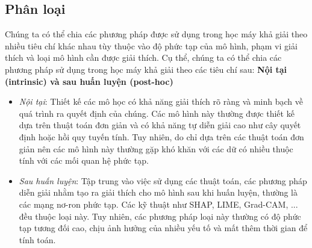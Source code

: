 


\subsection{Phân loại}
Chúng ta có thể chia các phương pháp được sử dụng trong học máy khả giải theo nhiều tiêu chí khác nhau tùy thuộc vào độ phức tạp của mô hình, phạm vi giải thích và loại mô hình cần được giải thích. Cụ thể, chúng ta có thể chia các phương pháp sử dụng trong học máy khả giải theo các tiêu chí sau:
\bigbreak\noindent
\textbf{Nội tại (intrinsic) và sau huấn luyện (post-hoc)}
\begin{itemize}
    \item \textit{Nội tại}: Thiết kế các mô học có khả năng giải thích rõ ràng và minh bạch về quá trình ra quyết định của chúng. Các mô hình này thường được thiết kế dựa trên thuật toán đơn giản và có khả năng tự diễn giải cao như cây quyết định hoặc hồi quy tuyến tính. Tuy nhiên, do chỉ dựa trên các thuật toán đơn giản nên các mô hình này thường gặp khó khăn với các dữ có nhiều thuộc tính với các mối quan hệ phức tạp.
    \item \textit{Sau huấn luyện}: Tập trung vào việc sử dụng các thuật toán, các phương pháp diễn giải nhằm tạo ra giải thích cho mô hình sau khi huấn luyện, thường là các mạng nơ-ron phức tạp. Các kỹ thuật như SHAP, LIME, Grad-CAM, ... đều thuộc loại này. Tuy nhiên, các phương pháp loại này thường có độ phức tạp tương đối cao, chịu ảnh hưởng của nhiều yếu tố và mất thêm thời gian để tính toán.
\end{itemize}

